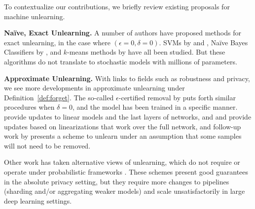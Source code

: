 To contextualize our contributions, we briefly review existing proposals for machine unlearning. 

\noindent\textbf{Na\"ive, Exact Unlearning.}
A number of authors have proposed methods for exact unlearning, in the case where $(\epsilon=0, \delta=0)$. SVMs by \cite{romero2007incremental} and \cite{karasuyama2009multiple}, Na\"ive Bayes Classifiers by \cite{cao2015towards}, and $k$-means methods by \cite{ginart2019making} have all been studied. 
But these algorithms do not translate to stochastic models with millions of parameters.

\noindent\textbf{Approximate Unlearning.} 
With links to fields such as robustness and privacy, we see more developments in approximate unlearning under Definition~\ref{def:forget}. 
The so-called $\epsilon$-certified removal by \cite{guo2019certified} puts forth similar procedures when $\delta=0$, and the model has been trained in a specific manner.
\cite{guo2019certified,izzo2020approximate} provide updates to linear models and the last layers of networks, and 
\cite{golatkar2020forgetting} and\cite{golatkar2020eternal} provide updates based on linearizations that work over the full network, and follow-up work by \cite{Golatkar_2021_CVPR} presents a scheme to unlearn under an assumption that some samples will not need to be removed.

Other work has taken alternative views of unlearning, which do not require or operate under probabilistic frameworks \citep{bourtoule2021machine,neel2021descent}. These schemes present good guarantees in the absolute privacy setting, but they require more changes to  pipelines (sharding and/or aggregating weaker models) and scale unsatisfactorily in large deep learning settings.